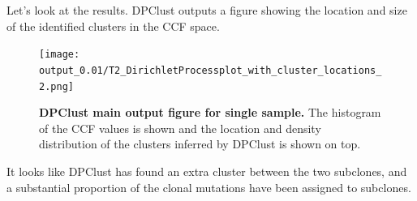 \documentclass[]{article}
\newenvironment{Shaded}{\begin{snugshade}}{\end{snugshade}}
\newcommand{\DataTypeTok}[1]{\textcolor[rgb]{0.13,0.29,0.53}{#1}}
\newcommand{\DecValTok}[1]{\textcolor[rgb]{0.00,0.00,0.81}{#1}}
\newcommand{\FloatTok}[1]{\textcolor[rgb]{0.00,0.00,0.81}{#1}}
\newcommand{\KeywordTok}[1]{\textcolor[rgb]{0.13,0.29,0.53}{\textbf{#1}}}
\newcommand{\NormalTok}[1]{#1}
\newcommand{\OperatorTok}[1]{\textcolor[rgb]{0.81,0.36,0.00}{\textbf{#1}}}
\newcommand{\OtherTok}[1]{\textcolor[rgb]{0.56,0.35,0.01}{#1}}
\newcommand{\StringTok}[1]{\textcolor[rgb]{0.31,0.60,0.02}{#1}}
\begin{document}
\begin{Shaded}
\end{Shaded}

Let's look at the results. DPClust outputs a figure showing the location
and size of the identified clusters in the CCF space.

\begin{figure}[H]
  \centering
  \texttt{[image: output\_0.01/T2\_DirichletProcessplot\_with\_cluster\_locations\_2.png]}
  \caption{\textbf{DPClust main output figure for single sample.}
  The histogram of the CCF values is shown and the location and
  density distribution of the clusters inferred by DPClust is shown on top.}
  \label{Figure6}
\end{figure}

It looks like DPClust has found an extra cluster between the two
subclones, and a substantial proportion of the clonal mutations have
been assigned to subclones.
\end{document}
